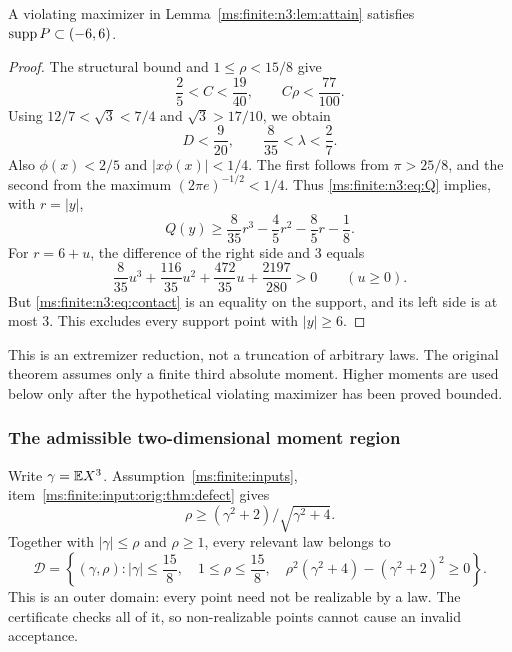 \begin{lemma}\label{ms:finite:n3:lem:support}
A violating maximizer in Lemma~\ref{ms:finite:n3:lem:attain} satisfies
$\operatorname{supp} P\subset(-6,6)$.
\end{lemma}
\begin{proof}
The structural bound and $1\le\rho<15/8$ give
\[
 \frac25<C<\frac{19}{40},\qquad C\rho<\frac{77}{100}.
\]
Using $12/7<\sqrt3<7/4$ and $\sqrt3>17/10$, we obtain
\[
 D<\frac9{20},\qquad \frac8{35}<\lambda<\frac27.
\]
Also $\phi(x)<2/5$ and $|x\phi(x)|<1/4$. The first follows from
$\pi>25/8$, and the second from the maximum
$(2\pi e)^{-1/2}<1/4$. Thus \eqref{ms:finite:n3:eq:Q} implies, with $r=|y|$,
\[
 Q(y)\ge\frac8{35}r^3-\frac45r^2-\frac85r-\frac18.
\]
For $r=6+u$, the difference of the right side and $3$ equals
\[
 \frac8{35}u^3+\frac{116}{35}u^2+\frac{472}{35}u+
 \frac{2197}{280}>0\qquad(u\ge0).
\]
But \eqref{ms:finite:n3:eq:contact} is an equality on the support, and its left side is
at most $3$. This excludes every support point with $|y|\ge6$.
\end{proof}
\begin{remark}
This is an extremizer reduction, not a truncation of arbitrary laws.
The original theorem assumes only a finite third absolute moment.
Higher moments are used below only after the hypothetical violating
maximizer has been proved bounded.
\end{remark}

\subsubsection{The admissible two-dimensional moment region}
Write $\gamma=\mathbb E X^3$. Assumption~\ref{ms:finite:inputs}, item~\ref{ms:finite:input:orig:thm:defect} gives
\[
 \rho\ge(\gamma^2+2)/\sqrt{\gamma^2+4}.
\]
Together with $|\gamma|\le\rho$ and $\rho\ge1$, every relevant law belongs to
\begin{equation}\label{ms:finite:n3:eq:momdomain}
 \mathcal D=\left\{(\gamma,\rho):
 |\gamma|\le\frac{15}{8},\quad1\le\rho\le\frac{15}{8},\quad
 \rho^2(\gamma^2+4)-(\gamma^2+2)^2\ge0\right\}.
\end{equation}
This is an outer domain: every point need not be realizable by a law.
The certificate checks all of it, so non-realizable points cannot cause
an invalid acceptance.

